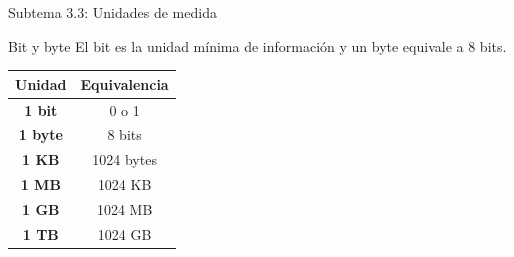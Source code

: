 \documentclass[10pt,aspectratio=169]{beamer}
\begin{document}
	
	\begin{frame}{Subtema 3.3: Unidades de medida}
		
		\small
		
		\begin{block}{Bit y byte}
			El bit es la unidad mínima de información y un byte equivale a 8 bits.
		\end{block}
		
		\begin{center}
			
			\begin{tabular}{>{\bfseries}c c}
				
				\toprule
				
				Unidad & Equivalencia \\
				
				\midrule
				
				1 bit & 0 o 1 \\
				
				1 byte & 8 bits \\
				
				1 KB & 1024 bytes \\
				
				1 MB & 1024 KB \\
				
				1 GB & 1024 MB \\
				
				1 TB & 1024 GB \\
				
				\bottomrule
				
			\end{tabular}
			
		\end{center}
		
	\end{frame}
	
	
\end{document}
